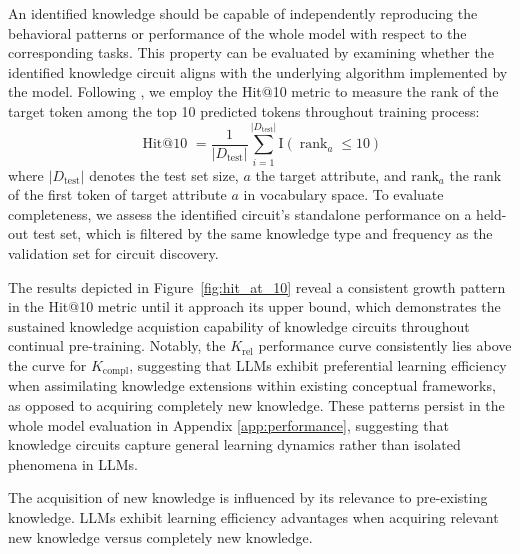 An identified knowledge should be capable of independently reproducing the behavioral patterns or performance of the whole model with respect to the corresponding tasks.
This property can be evaluated by examining whether the identified knowledge circuit aligns with the underlying algorithm implemented by the model.
Following \citet{knowledge_circuits}, we employ the Hit@10 metric to measure the rank of the target token among the top 10 predicted tokens throughout training process:
\begin{equation}
    \text { Hit@10 }=\frac{1}{|D_{\text{test}}|} \sum_{i=1}^{|D_{\text{test}}|} \mathrm{I}\left(\operatorname{rank}_a \leq 10\right)
\end{equation}
where $|D_{\text{test}}|$ denotes the test set size, $a$ the target attribute, and $\text{rank}_a$ the rank of the first token of target attribute $a$ in vocabulary space. 
To evaluate completeness, we assess the identified circuit's standalone performance on a held-out test set, which is filtered by the same knowledge type and frequency as the validation set for circuit discovery.

The results depicted in Figure~\ref{fig:hit_at_10} reveal a consistent growth pattern in the Hit@10 metric until it approach its upper bound, which demonstrates the sustained knowledge acquistion capability of knowledge circuits throughout continual pre-training.
Notably, the $K_\text{rel}$ performance curve consistently lies above the curve for $K_\text{compl}$, suggesting that LLMs exhibit preferential learning efficiency when assimilating knowledge extensions within existing conceptual frameworks, as opposed to acquiring completely new knowledge.
These patterns persist in the whole model evaluation in Appendix \ref{app:performance}, suggesting that knowledge circuits capture general learning dynamics rather than isolated phenomena in LLMs.

\begin{tcolorbox}[mybox, title={Takeaway: Knowledge Relevance Principle}]
The acquisition of new knowledge is influenced by its relevance to pre-existing knowledge. LLMs exhibit learning efficiency advantages when acquiring relevant new knowledge versus completely new knowledge.
\end{tcolorbox}

